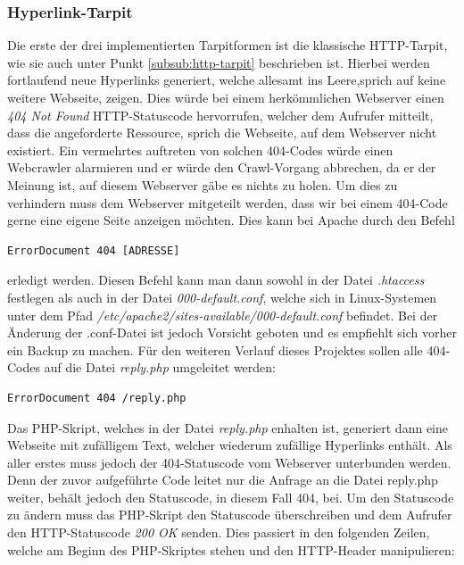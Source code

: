 \subsubsection{Hyperlink-Tarpit}
Die erste der drei implementierten Tarpitformen ist die klassische HTTP-Tarpit, wie sie auch unter Punkt \ref{subsub:http-tarpit} beschrieben ist. Hierbei werden fortlaufend neue Hyperlinks generiert, welche allesamt \glqq ins Leere\grqq,\space sprich auf keine weitere Webseite, zeigen. Dies würde bei einem herkömmlichen Webserver einen \emph{404 Not Found} HTTP-Statuscode hervorrufen, welcher dem Aufrufer mitteilt, dass die angeforderte Ressource, sprich die Webseite, auf dem Webserver nicht existiert. Ein vermehrtes auftreten von solchen 404-Codes würde einen Webcrawler alarmieren und er würde den Crawl-Vorgang abbrechen, da er der Meinung ist, auf diesem Webserver gäbe es nichts zu holen. Um dies zu verhindern muss dem Webserver mitgeteilt werden, dass wir bei einem 404-Code gerne eine eigene Seite anzeigen möchten. Dies kann bei Apache durch den Befehl
\begin{lstlisting}
ErrorDocument 404 [ADRESSE]
\end{lstlisting} 
erledigt werden. Diesen Befehl kann man dann sowohl in der Datei \emph{.htaccess} festlegen als auch in der Datei \emph{000-default.conf}, welche sich in Linux-Systemen unter dem Pfad \emph{/etc/apache2/sites-available/000-default.conf} befindet. Bei der Änderung der .conf-Datei ist jedoch Vorsicht geboten und es empfiehlt sich vorher ein Backup zu machen. Für den weiteren Verlauf dieses Projektes sollen alle 404-Codes auf die Datei \emph{reply.php} umgeleitet werden:
\begin{lstlisting}
ErrorDocument 404 /reply.php
\end{lstlisting}
Das PHP-Skript, welches in der Datei \emph{reply.php} enhalten ist, generiert dann eine Webseite mit zufälligem Text, welcher wiederum zufällige Hyperlinks enthält. Als aller erstes muss jedoch der 404-Statuscode vom Webserver unterbunden werden. Denn der zuvor aufgeführte Code leitet nur die Anfrage an die Datei reply.php weiter, behält jedoch den Statuscode, in diesem Fall 404, bei. Um den Statuscode zu ändern muss das PHP-Skript den Statuscode überschreiben und dem Aufrufer den HTTP-Statuscode \emph{200 OK} senden. Dies passiert in den folgenden Zeilen, welche am Beginn des PHP-Skriptes stehen und den HTTP-Header manipulieren:

